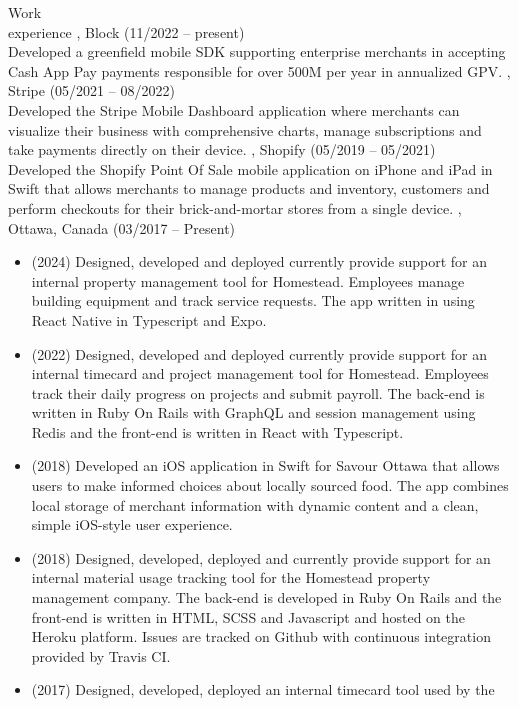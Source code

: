 \documentclass{resume}
\begin{document}
\begin{category}{Work \\experience}
, Block (11/2022 -- present)\\
Developed a greenfield mobile SDK supporting enterprise merchants in accepting Cash App
Pay payments responsible for over 500M per year in annualized GPV.
, Stripe (05/2021 -- 08/2022)\\
Developed the Stripe Mobile Dashboard application where merchants can visualize their business
with comprehensive charts, manage subscriptions and take payments
directly on their device.
, Shopify (05/2019 -- 05/2021)\\
Developed the Shopify Point Of Sale mobile application on iPhone and iPad in Swift that
allows merchants to manage products and inventory, customers and perform checkouts for
their brick-and-mortar stores from a single device.
, Ottawa, Canada (03/2017 -- Present)
\begin{itemize}
  \item (2024) Designed, developed and deployed currently provide support for an internal
    property management tool for Homestead. Employees manage building equipment and track
    service requests. The app written in using React Native in Typescript and Expo.
  \item (2022) Designed, developed and deployed currently provide support for an internal
    timecard and project management tool for Homestead. Employees track their daily progress
    on projects and submit payroll. The back-end is written in Ruby On Rails with GraphQL and
    session management using Redis and the front-end is written in React with Typescript.
  \item (2018) Developed an iOS application in Swift for Savour Ottawa that allows
    users to make informed choices about locally sourced food. The app combines
    local storage of merchant information with dynamic content and a clean,
    simple iOS-style user experience.
  \item (2018) Designed, developed, deployed and currently provide support for an
    internal material usage tracking tool for the Homestead property management
    company. The back-end is developed in Ruby On Rails and the front-end is written
    in HTML, SCSS and Javascript and hosted on the Heroku platform. Issues are tracked
    on Github with continuous integration provided by Travis CI.
  \item (2017) Designed, developed, deployed an internal timecard tool used by the

\end{itemize}
\end{category}
\end{document}
